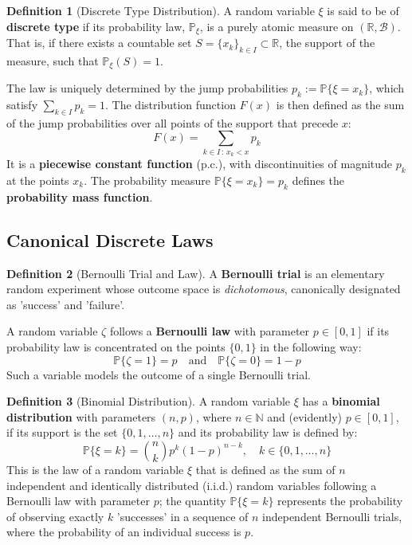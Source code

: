 \documentclass[12pt, openany]{book}
\theoremstyle{definition}
\newtheorem{definition}{Definition}[section]
\theoremstyle{plain}
\theoremstyle{remark}
\newcommand{\R}{\mathbb{R}}
\newcommand{\B}{\mathcal{B}}
\newcommand{\probP}{\mathbb{P}}
\begin{document}
\begin{definition}[Discrete Type Distribution]
A random variable $\xi$ is said to be of \textbf{discrete type} if its probability law, $\probP_\xi$, is a purely atomic measure on $(\R, \B)$. That is, if there exists a countable set $S = \{x_k\}_{k \in I} \subset \R$, the support of the measure, such that $\probP_\xi(S) = 1$.

The law is uniquely determined by the jump probabilities $p_k := \probP\{\xi = x_k\}$, which satisfy $\sum_{k \in I} p_k = 1$. The distribution function $F(x)$ is then defined as the sum of the jump probabilities over all points of the support that precede $x$:
$$ F(x) = \sum_{k \in I \,:\, x_k < x} p_k $$
It is a \textbf{piecewise constant function} (p.c.), with discontinuities of magnitude $p_k$ at the points $x_k$. The probability measure $\probP\{\xi = x_k\}=p_k$ defines the \textbf{probability mass function}.
\end{definition}

\subsection{Canonical Discrete Laws}

\begin{definition}[Bernoulli Trial and Law]
A \textbf{Bernoulli trial} is an elementary random experiment whose outcome space is \textit{dichotomous}, canonically designated as 'success' and 'failure'.

A random variable $\zeta$ follows a \textbf{Bernoulli law} with parameter $p \in [0,1]$ if its probability law is concentrated on the points $\{0, 1\}$ in the following way:
$$ \probP\{\zeta=1\} = p \quad \text{and} \quad \probP\{\zeta=0\} = 1-p $$
Such a variable models the outcome of a single Bernoulli trial.
\end{definition}

\begin{definition}[Binomial Distribution]
A random variable $\xi$ has a \textbf{binomial distribution} with parameters $(n, p)$, where $n \in \mathbb{N}$ and (evidently) $p \in [0,1]$, if its support is the set $\{0, 1, \dots, n\}$ and its probability law is defined by:
$$ \probP\{\xi=k\} = \binom{n}{k} p^k (1-p)^{n-k}, \quad k \in \{0, 1, \dots, n\} $$
This is the law of a random variable $\xi$ that is defined as the sum of $n$ independent and identically distributed (i.i.d.) random variables following a Bernoulli law with parameter $p$; the quantity $\probP\{\xi=k\}$ represents the probability of observing exactly $k$ 'successes' in a sequence of $n$ independent Bernoulli trials, where the probability of an individual success is $p$.
\end{definition}
\end{document}

